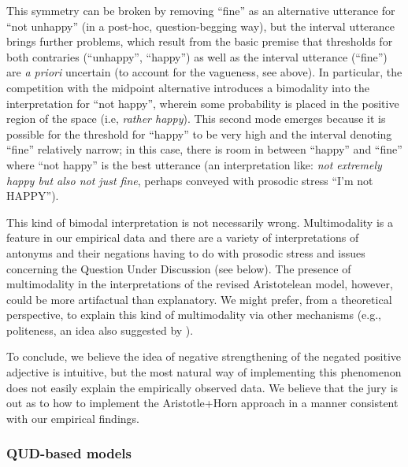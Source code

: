 \documentclass[floatsintext,doc]{apa6}
\begin{document}
This symmetry can be broken by removing ``fine'' as an alternative utterance for ``not
unhappy'' (in a post-hoc, question-begging way), but the interval utterance brings further
problems, which result from the basic premise that thresholds for both contraries (``unhappy'',
``happy'') as well as the interval utterance (``fine'') are \emph{a priori} uncertain (to account for the vagueness, see above). 
In particular, the competition with the midpoint alternative introduces a bimodality into the interpretation for ``not happy'', wherein some probability is placed in the positive region of the space (i.e, \emph{rather happy}).
This second mode emerges because it is possible for the threshold for ``happy'' to be very high and the interval denoting ``fine'' relatively narrow; in this case, there is room in between ``happy'' and ``fine'' where ``not happy'' is the best utterance (an interpretation like: \emph{not extremely happy but also not just fine}, perhaps conveyed with prosodic stress ``I'm not HAPPY''). 

This kind of bimodal interpretation is not necessarily wrong. Multimodality is a feature in our empirical data and there are a variety of interpretations of antonyms and their negations having to do with prosodic stress and issues concerning the Question Under Discussion (see below). 
The presence of multimodality in the interpretations of the revised Aristotelean model, however, could be more artifactual than explanatory. 
We might prefer, from a theoretical perspective, to explain this kind of multimodality via other mechanisms (e.g., politeness, an idea also suggested by ). 

To conclude, we believe the idea of negative strengthening of the negated positive adjective is intuitive, but the most natural way of implementing this phenomenon does not easily explain the empirically observed data. We believe that the jury is out as to how to implement the Aristotle+Horn approach in a manner consistent with our empirical findings. 


\subsubsection{QUD-based models}
\end{document}

